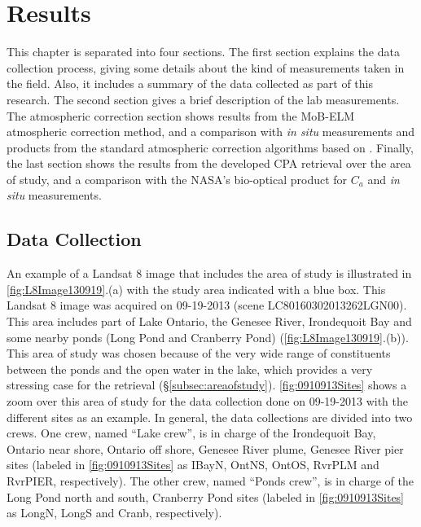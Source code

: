 \chapter{Results}
\label{ch:results}
This chapter is separated into four sections. The first section explains the data collection process, giving some details about the kind of measurements taken in the field. Also, it includes a summary of the data collected as part of this research. The second section gives a brief description of the lab measurements. The atmospheric correction section shows results from the MoB-ELM atmospheric correction method, and a comparison with {\it in situ} measurements and products from the standard atmospheric correction algorithms based on \citet{Gordon:1994}. Finally, the last section shows the results from the developed CPA retrieval over the area of study, and a comparison with the NASA's bio-optical product for $C_a$ and {\it in situ} measurements.
\section{Data Collection}
An example of a Landsat 8 image that includes the area of study is illustrated in \autoref{fig:L8Image130919}.(a) with the study area indicated with a blue box. This Landsat 8 image was acquired on 09-19-2013 (scene LC80160302013262LGN00). This area includes part of Lake Ontario, the Genesee River, Irondequoit Bay and some nearby ponds (Long Pond and Cranberry Pond) (\autoref{fig:L8Image130919}.(b)). This area of study was chosen because of the very wide range of constituents between the ponds and the open water in the lake, which provides a very stressing case for the retrieval (\S\ref{subsec:areaofstudy}). \autoref{fig:0910913Sites} shows a zoom over this area of study for the data collection done on 09-19-2013  with the different sites as an example. In general, the data collections are divided into two crews. One crew, named ``Lake crew'', is in charge of the Irondequoit Bay, Ontario near shore, Ontario off shore, Genesee River plume, Genesee River pier sites (labeled in \autoref{fig:0910913Sites} as IBayN, OntNS, OntOS, RvrPLM and RvrPIER, respectively). The other crew, named ``Ponds crew'', is in charge of the Long Pond north and south, Cranberry Pond sites (labeled in \autoref{fig:0910913Sites} as LongN, LongS and Cranb, respectively).


